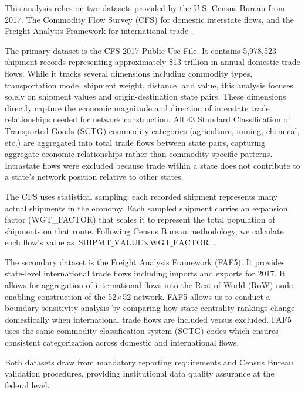 \documentclass[12pt,oneside]{book}
\begin{document}
This analysis relies on two datasets provided by the U.S. Census Bureau from 2017. The Commodity Flow Survey (CFS) for domestic interstate flows, and the Freight Analysis Framework for international trade \cite{bureau_commodity_2025, united_states_department_of_transportation_office_of_the_secretary_of_transportation_freight_2017}.

The primary dataset is the CFS 2017 Public Use File. It contains 5,978,523 shipment records representing approximately \$13 trillion in annual domestic trade flows. While it tracks several dimensions including commodity types, transportation mode, shipment weight, distance, and value, this analysis focuses solely on shipment values and origin-destination state pairs. These dimensions directly capture the economic magnitude and direction of interstate trade relationships needed for network construction. All 43 Standard Classification of Transported Goods (SCTG) commodity categories (agriculture, mining, chemical, etc.) are aggregated into total trade flows between state pairs, capturing aggregate economic relationships rather than commodity-specific patterns. Intrastate flows were excluded because trade within a state does not contribute to a state's network position relative to other states. 

The CFS uses statistical sampling: each recorded shipment represents many actual shipments in the economy. Each sampled shipment carries an expansion factor (WGT\_FACTOR) that scales it to represent the total population of shipments on that route. Following Census Bureau methodology, we calculate each flow's value as $\text{SHIPMT\_VALUE} \times \text{WGT\_FACTOR}$ \cite{bureau_commodity_2025}.


The secondary dataset is the Freight Analysis Framework (FAF5). It provides state-level international trade flows including imports and exports for 2017. It allows for aggregation of international flows into the Rest of World (RoW) node, enabling construction of the 52$\times$52 network. FAF5 allows us to conduct a boundary sensitivity analysis by comparing how state centrality rankings change domestically when international trade flows are included versus excluded. FAF5 uses the same commodity classification system (SCTG) codes which ensures consistent categorization across domestic and international flows. 

Both datasets draw from mandatory reporting requirements and Census Bureau validation procedures, providing institutional data quality assurance at the federal level.
\end{document}
